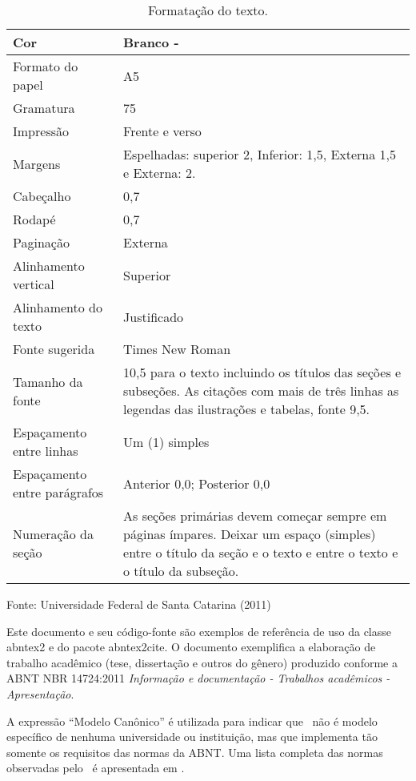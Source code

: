 \begin{table}[!htb]
	\begin{center}
		\caption{Formatação do texto. \showfont}
		\label{tab:a}
		\begin{tabular}{ p{3cm} | p{6cm} }
			\hline
			Cor & Branco - \showfont\\ \hline
			Formato do papel & A5\\ \hline
			Gramatura & 75\\ \hline
			Impressão & Frente e verso\\ \hline
			Margens & Espelhadas: superior 2, Inferior: 1,5, Externa 1,5 e Externa: 2.\\ \hline
			Cabeçalho & 0,7\\ \hline
			Rodapé & 0,7\\ \hline
			Paginação & Externa\\ \hline
			Alinhamento vertical & Superior\\ \hline
			Alinhamento do texto & Justificado\\ \hline
			Fonte sugerida & Times New Roman \\ \hline
			Tamanho da fonte & 10,5 para o texto incluindo os títulos das seções e subseções. As citações com mais de três linhas as legendas das ilustrações e tabelas, fonte 9,5.\\ \hline
			Espaçamento entre linhas & Um (1) simples\\ \hline
			Espaçamento entre parágrafos & Anterior 0,0; Posterior 0,0\\ \hline
			Numeração da seção & As seções  primárias devem  começar  sempre em páginas ímpares. Deixar um espaço (simples) entre o título da seção e o texto e  entre o texto e o título da subseção. \\  \hline
		\end{tabular}
	\end{center}
	Fonte: Universidade Federal de Santa Catarina (2011) \showfont
\end{table}






Este documento e seu código-fonte são exemplos de referência de uso da classe
\textsf{abntex2} e do pacote \textsf{abntex2cite}. O documento 
exemplifica a elaboração de trabalho acadêmico (tese, dissertação e outros do
gênero) produzido conforme a ABNT NBR 14724:2011 \emph{Informação e documentação
	- Trabalhos acadêmicos - Apresentação}.

A expressão ``Modelo Canônico'' é utilizada para indicar que \abnTeX\ não é
modelo específico de nenhuma universidade ou instituição, mas que implementa tão
somente os requisitos das normas da ABNT. Uma lista completa das normas
observadas pelo \abnTeX\ é apresentada em .

